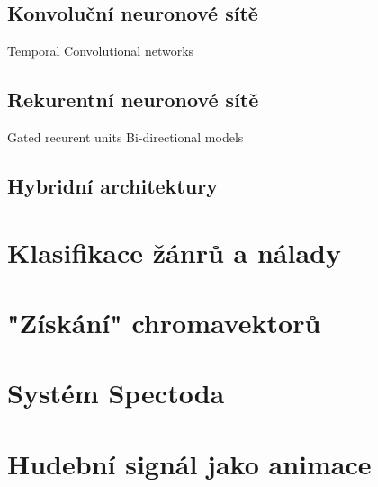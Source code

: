   \subsection{Konvoluční neuronové sítě}
    Temporal Convolutional networks

  \subsection{Rekurentní neuronové sítě}
    Gated recurent units
    Bi-directional models

  \subsection{Hybridní architektury}

\section{Klasifikace žánrů a nálady} \label{sec:Klasifikace_zanru}

\section{"Získání" chromavektorů}

\section{Systém Spectoda} \label{sec:Spectoda}

\section{Hudební signál jako animace}